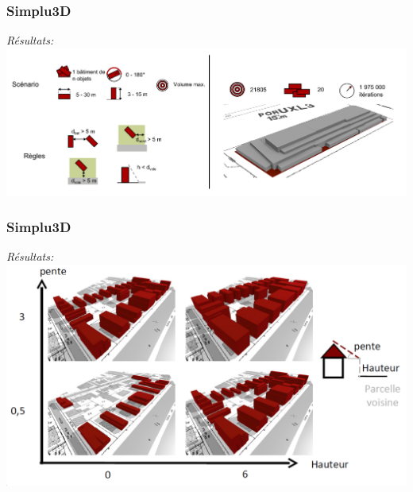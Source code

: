 \documentclass{beamer}
\begin{document}
\begin{frame}
\frametitle{Simplu3D}
\emph{R\'esultats:}
 \includegraphics[width=\textwidth]{simplu3D1.png}
\end{frame}

\begin{frame}
\frametitle{Simplu3D}
\emph{R\'esultats:}
 \includegraphics[width=\textwidth]{simplu3D2.png}
\end{frame}
\end{document}
